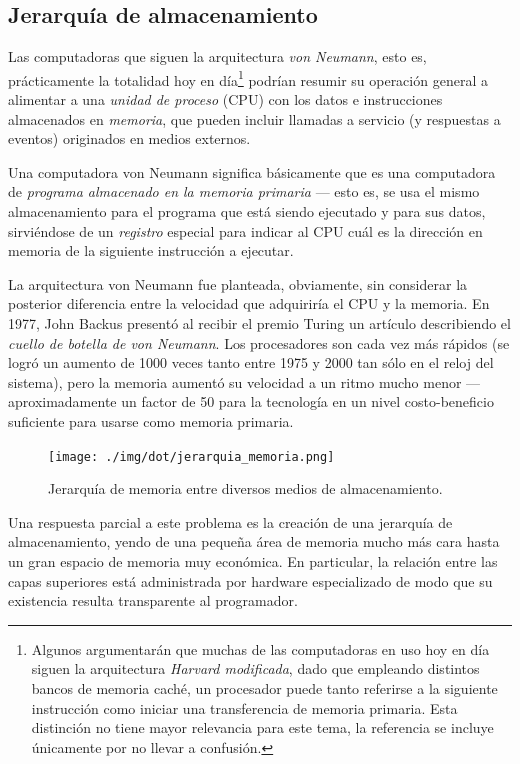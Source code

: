 \documentclass[11pt,fleqn]{book} %
\begin{document}
\subsection{Jerarquía de almacenamiento}
\label{sec-2-2-1}



Las computadoras que siguen la arquitectura \emph{von Neumann}, esto es,
prácticamente la totalidad hoy en día\footnote{Algunos argumentarán que
muchas de las computadoras en uso hoy en día siguen la arquitectura
\emph{Harvard modificada}, dado que empleando distintos bancos de memoria
caché, un procesador puede tanto referirse a la siguiente instrucción
como iniciar una transferencia de memoria primaria. Esta distinción no
tiene mayor relevancia para este tema, la referencia se incluye
únicamente por no llevar a confusión. } podrían resumir su operación
general a alimentar a una \emph{unidad de proceso} (CPU) con los datos e
instrucciones almacenados en \emph{memoria}, que pueden incluir llamadas a
servicio (y respuestas a eventos) originados en medios externos.

Una computadora von Neumann significa básicamente que es una
computadora de \emph{programa almacenado en la memoria primaria} — esto es,
se usa el mismo almacenamiento para el programa que está siendo
ejecutado y para sus datos, sirviéndose de un \emph{registro} especial para
indicar al CPU cuál es la dirección en memoria de la siguiente
instrucción a ejecutar.

La arquitectura von Neumann fue planteada, obviamente, sin considerar
la posterior diferencia entre la velocidad que adquiriría el CPU y la
memoria. En 1977, John Backus presentó al recibir el premio Turing un
artículo describiendo el \emph{cuello de botella de von Neumann}. Los
procesadores son cada vez más rápidos (se logró un aumento de 1000
veces tanto entre 1975 y 2000 tan sólo en el reloj del sistema), pero
la memoria aumentó su velocidad a un ritmo mucho menor —
aproximadamente un factor de 50 para la tecnología en un nivel
costo-beneficio suficiente para usarse como memoria primaria.

\begin{figure}[htb]
\centering
\texttt{[image: ./img/dot/jerarquia\_memoria.png]}
\caption{\label{HW_jerarquia_memoria}Jerarquía de memoria entre diversos medios de almacenamiento.}
\end{figure}

Una respuesta parcial a este problema es la creación de una jerarquía
de almacenamiento, yendo de una pequeña área de memoria mucho más cara
hasta un gran espacio de memoria muy económica. En particular, la
relación entre las capas superiores está administrada por hardware
especializado de modo que su existencia resulta transparente al
programador.
\end{document}
